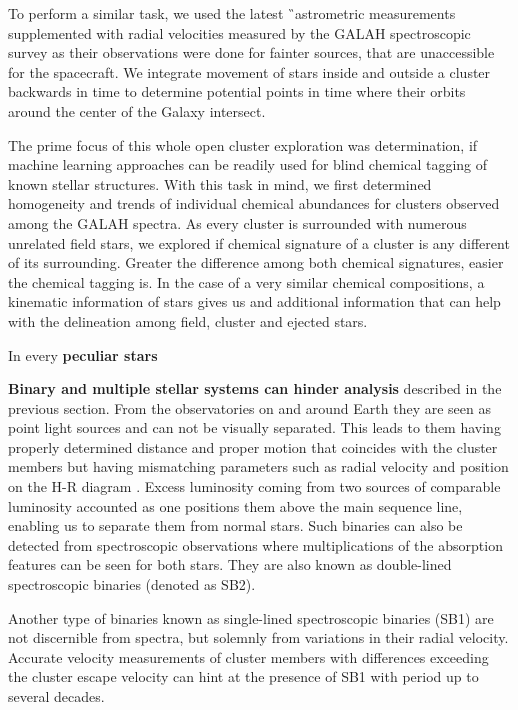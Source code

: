 To perform a similar task, we used the latest \G\ astrometric measurements supplemented with radial velocities measured by the GALAH spectroscopic survey as their observations were done for fainter sources, that are unaccessible for the spacecraft. We integrate movement of stars inside and outside a cluster backwards in time to determine potential points in time where their orbits around the center of the Galaxy intersect. %

The prime focus of this whole open cluster exploration was determination, if machine learning approaches can be readily used for blind chemical tagging of known stellar structures. With this task in mind, we first determined homogeneity and trends of individual chemical abundances for clusters observed among the GALAH spectra. As every cluster is surrounded with numerous unrelated field stars, we explored if chemical signature of a cluster is any different of its surrounding. Greater the difference among both chemical signatures, easier the chemical tagging is. In the case of a very similar chemical compositions, a kinematic information of stars gives us and additional information that can help with the delineation among field, cluster and ejected stars. 

In every \textbf{peculiar stars}




\textbf{Binary and multiple stellar systems can hinder analysis} described in the previous section. From the observatories on and around Earth they are seen as point light sources and can not be visually separated. This leads to them having properly determined distance and proper motion that coincides with the cluster members but having mismatching parameters such as radial velocity and position on the H-R diagram \cite{2007A&A...473..829M}. Excess luminosity coming from two sources of comparable luminosity accounted as one positions them above the main sequence line, enabling us to separate them from normal stars. Such binaries can also be detected from spectroscopic observations where multiplications of the absorption features can be seen for both stars. They are also known as double-lined spectroscopic binaries (denoted as SB2).

Another type of binaries known as single-lined spectroscopic binaries (SB1) are not discernible from spectra, but solemnly from variations in their radial velocity. Accurate velocity measurements of cluster members with differences exceeding the cluster escape velocity can hint at the presence of SB1 with period up to several decades.

